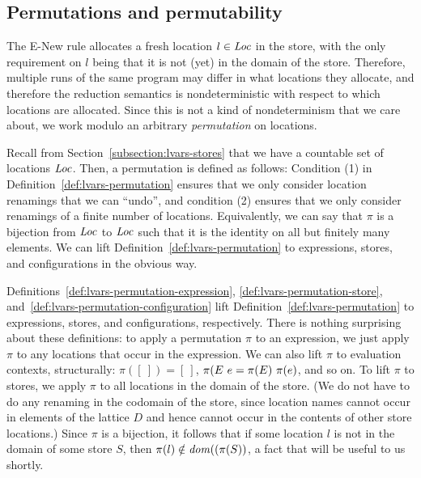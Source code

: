 \subsection{Permutations and permutability}\label{subsection:lvars-permutations}

The {\sc E-New} rule allocates a fresh location $l \in \mathit{Loc}$ in the
store, with the only requirement on $l$ being that it is not (yet) in
the domain of the store.  Therefore, multiple runs of the same program
may differ in what locations they allocate, and therefore the
reduction semantics is nondeterministic with respect to which
locations are allocated.  Since this is not a kind of nondeterminism
that we care about, we work modulo an arbitrary \emph{permutation} on
locations.

Recall from Section~\ref{subsection:lvars-stores} that we have a
countable set of locations $\mathit{Loc}$.  Then, a permutation is defined as
follows:
\LVarsDefPermutation
Condition (1) in Definition~\ref{def:lvars-permutation} ensures that
we only consider location renamings that we can ``undo'', and
condition (2) ensures that we only consider renamings of a finite
number of locations.  Equivalently, we can say that $\pi$ is a
bijection from $\mathit{Loc}$ to $\mathit{Loc}$ such that it is the identity on all
but finitely many elements.
\ifdefined\JOURNAL
We can lift Definition~\ref{def:lvars-permutation} to expressions,
stores, and configurations in the obvious way.
\fi

\ifdefined\DISSERTATION
Definitions~\ref{def:lvars-permutation-expression},
\ref{def:lvars-permutation-store},
and~\ref{def:lvars-permutation-configuration} lift
Definition~\ref{def:lvars-permutation} to expressions, stores, and
configurations, respectively.  There is nothing surprising about these
definitions: to apply a permutation $\pi$ to an expression, we just
apply $\pi$ to any locations that occur in the expression.  We can
also lift $\pi$ to evaluation contexts, structurally: $\pi([~]) =
[~]$, $\pi(E~e = \pi(E)~\pi(e)$, and so on.  To lift
$\pi$ to stores, we apply $\pi$ to all locations in the domain of the
store.  (We do not have to do any renaming in the codomain of the
store, since location names cannot occur in elements of the lattice
$D$ and hence cannot occur in the contents of other store locations.)
Since $\pi$ is a bijection, it follows that if some location $l$ is
not in the domain of some store $S$, then $\pi(l) \notin
\mathit{dom}((\pi(S))$, a fact
that will be useful to us shortly.

